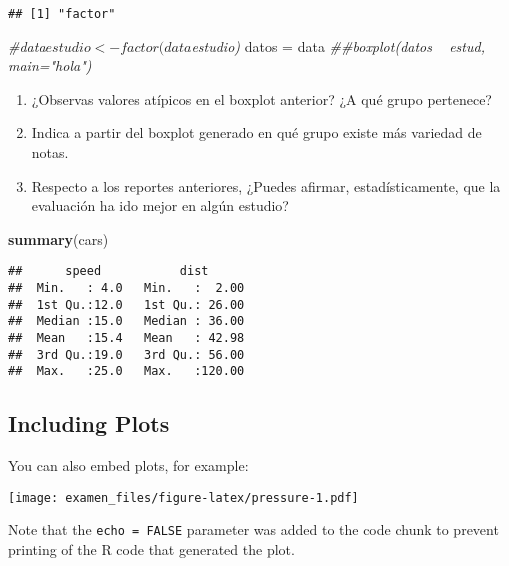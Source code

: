\documentclass[]{article}
\newenvironment{Shaded}{\begin{snugshade}}{\end{snugshade}}
\newcommand{\CommentTok}[1]{\textcolor[rgb]{0.56,0.35,0.01}{\textit{#1}}}
\newcommand{\KeywordTok}[1]{\textcolor[rgb]{0.13,0.29,0.53}{\textbf{#1}}}
\newcommand{\NormalTok}[1]{#1}
\newcommand{\OperatorTok}[1]{\textcolor[rgb]{0.81,0.36,0.00}{\textbf{#1}}}
\newcommand{\StringTok}[1]{\textcolor[rgb]{0.31,0.60,0.02}{#1}}
\providecommand{\tightlist}{%
  \setlength{\itemsep}{0pt}\setlength{\parskip}{0pt}}
\begin{document}
\begin{Shaded}
\end{Shaded}

\begin{verbatim}
## [1] "factor"
\end{verbatim}

\begin{Shaded}
\begin{Highlighting}[]
\CommentTok{#data$estudio <- factor(data$estudio)}
\NormalTok{datos =}\StringTok{ }\NormalTok{data}
\CommentTok{##boxplot(datos ~ estud, main="hola")}
\end{Highlighting}
\end{Shaded}

\begin{enumerate}
\def\labelenumi{\alph{enumi})}
\setcounter{enumi}{3}
\tightlist
\item
  ¿Observas valores atípicos en el boxplot anterior? ¿A qué grupo
  pertenece?
\item
  Indica a partir del boxplot generado en qué grupo existe más variedad
  de notas.
\item
  Respecto a los reportes anteriores, ¿Puedes afirmar, estadísticamente,
  que la evaluación ha ido mejor en algún estudio?
\end{enumerate}

\begin{Shaded}
\begin{Highlighting}[]
\KeywordTok{summary}\NormalTok{(cars)}
\end{Highlighting}
\end{Shaded}

\begin{verbatim}
##      speed           dist       
##  Min.   : 4.0   Min.   :  2.00  
##  1st Qu.:12.0   1st Qu.: 26.00  
##  Median :15.0   Median : 36.00  
##  Mean   :15.4   Mean   : 42.98  
##  3rd Qu.:19.0   3rd Qu.: 56.00  
##  Max.   :25.0   Max.   :120.00
\end{verbatim}

\hypertarget{including-plots}{%
\subsection{Including Plots}\label{including-plots}}

You can also embed plots, for example:

\texttt{[image: examen\_files/figure-latex/pressure-1.pdf]}

Note that the \texttt{echo\ =\ FALSE} parameter was added to the code
chunk to prevent printing of the R code that generated the plot.
\end{document}
